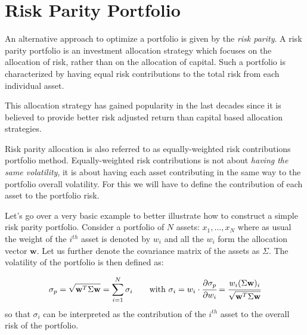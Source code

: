 %
%

\section{Risk Parity Portfolio}
\label{risk-parity-portfolio}

An alternative approach to optimize a portfolio is given by the \emph{risk parity}. A risk parity portfolio is an investment allocation strategy which focuses on the allocation of risk, rather than on the allocation of capital. 
Such a portfolio is characterized by having equal risk contributions to the total risk from each individual asset. 

This allocation strategy has gained popularity in the last decades since it is believed to provide better risk adjusted return than capital based allocation strategies.

Risk parity allocation is also referred to as equally-weighted risk contributions portfolio method. Equally-weighted risk contributions is not about \emph{having the same volatility}, it is about having each asset contributing in the same way to the portfolio overall volatility. For this we will have to define the contribution of each asset to the portfolio risk. 

Let's go over a very basic example to better illustrate how to construct a simple risk parity portfolio. Consider a portfolio of \(N\) assets: \(x_{1}, \ldots, x_N\) where as usual the weight of the $i^{th}$ asset is denoted by \(w_{i}\) and all the \(w_{i}\) form the allocation vector \(\mathbf{w}\). Let us further denote the covariance matrix of the assets as \(\Sigma\). The volatility of the portfolio is then defined as:

\begin{equation} 
\sigma_p={\sqrt {\mathbf{w}^T\Sigma \mathbf{w}}} = \sum_{i=1}^{N}\sigma _{i}\qquad\textrm{with}~\sigma _{i} = w_{i}\cdot \cfrac{\partial\sigma_p}{\partial w_{i}}={\cfrac {w_{i}(\Sigma \mathbf{w})_{i}}{\sqrt {\mathbf{w}^T\Sigma \mathbf{w}}}}
\end{equation}
so that \(\sigma _{i}\) can be interpreted as the contribution of the $i^{th}$ asset to the overall risk of the portfolio.

